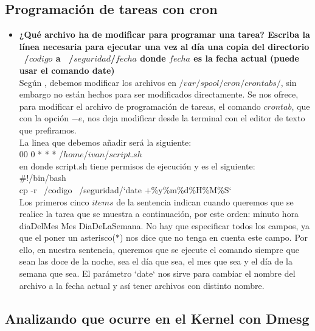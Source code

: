 \subsection{Programación de tareas con cron}
\begin{itemize}
	\item \textbf{¿Qué archivo ha de modificar para programar una tarea? Escriba la línea necesaria para ejecutar una vez al día una copia del directorio ~/$codigo$ a ~/$seguridad$/$fecha$ donde $fecha$ es la fecha actual (puede usar el comando date)}\\
	Según \cite{crontab}, debemos modificar los archivos en $/var/spool/cron/crontabs/$, sin embargo no están hechos para ser modificados directamente. Se nos ofrece, para modificar el archivo de programación de tareas, el comando $crontab$, que con la opción $-e$, nos deja modificar desde la terminal con el editor de texto que prefiramos.\\
	
	La linea que debemos añadir será la siguiente:\\
	
	00 0 * * *  /$home$/$ivan$/$script.sh$\\
	
	en donde script.sh tiene permisos de ejecución y es el siguiente:\\
	
	\#!/bin/bash\\
	cp -r ~/codigo ~/seguridad/`date +\%y\%m\%d\%H\%M\%S`\\
	
	
	Los primeros cinco $items$ de la sentencia indican cuando queremos que se realice la tarea que se muestra a continuación, por este orden: minuto hora diaDelMes Mes DiaDeLaSemana. No hay que especificar todos los campos, ya que el poner un asterisco($*$) nos dice que no tenga en cuenta este campo. Por ello, en nuestra sentencia, queremos que se ejecute el comando siempre que sean las doce de la noche, sea el día que sea, el mes que sea y el día de la semana que sea. El parámetro `date` nos sirve para cambiar el nombre del archivo a la fecha actual y así tener archivos con distinto nombre.
\end{itemize}

\subsection{Analizando que ocurre en el Kernel con Dmesg}

